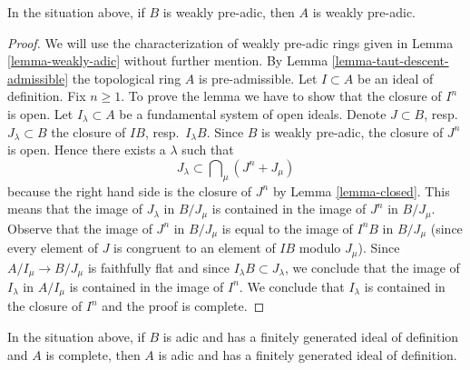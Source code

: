 \begin{lemma}
\label{lemma-taut-descent-weakly-adic}
In the situation above, if $B$ is weakly pre-adic, then $A$
is weakly pre-adic.
\end{lemma}

\begin{proof}
We will use the characterization of weakly pre-adic rings given in
Lemma \ref{lemma-weakly-adic} without further mention.
By Lemma \ref{lemma-taut-descent-admissible}
the topological ring $A$ is pre-admissible.
Let $I \subset A$ be an ideal of definition.
Fix $n \geq 1$. To prove the lemma we have
to show that the closure of $I^n$ is open.
Let $I_\lambda \subset A$ be a fundamental system of open ideals.
Denote $J \subset B$, resp.\ $J_\lambda \subset B$
the closure of $IB$, resp.\ $I_\lambda B$.
Since $B$ is weakly pre-adic, the closure of $J^n$ is open.
Hence there exists a $\lambda$ such that
$$
J_\lambda \subset \bigcap\nolimits_\mu (J^n + J_\mu)
$$
because the right hand side is the closure of $J^n$ by
Lemma \ref{lemma-closed}.
This means that the image of $J_\lambda$ in $B/J_\mu$ is contained in the
image of $J^n$ in $B/J_\mu$. Observe that the image of $J^n$ in
$B/J_\mu$ is equal to the image of $I^nB$ in $B/J_\mu$ (since every element
of $J$ is congruent to an element of $IB$ modulo $J_\mu$).
Since $A/I_\mu \to B/J_\mu$ is faithfully flat and since
$I_\lambda B \subset J_\lambda$,
we conclude that the image of $I_\lambda$ in $A/I_\mu$
is contained in the image of $I^n$.
We conclude that $I_\lambda$ is contained in the closure
of $I^n$ and the proof is complete.
\end{proof}

\begin{lemma}
\label{lemma-taut-descent-adic-star}
In the situation above, if $B$ is adic and has a finitely generated
ideal of definition and $A$ is complete, then $A$ is adic and
has a finitely generated ideal of definition.
\end{lemma}

